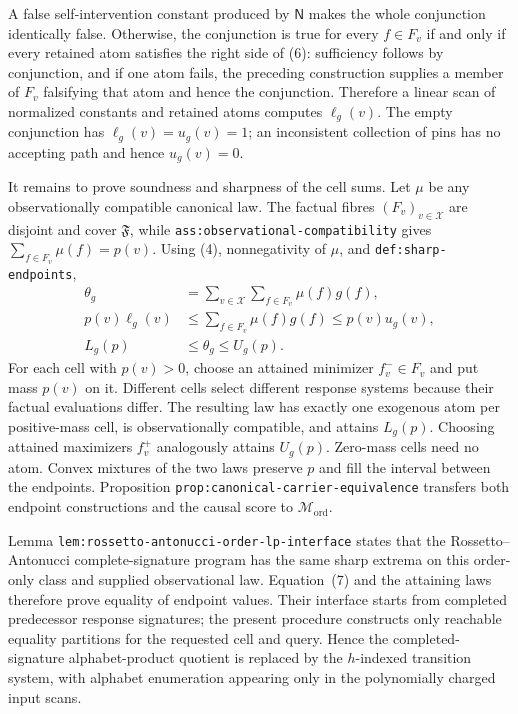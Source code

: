 A false self-intervention constant produced by \(\mathsf N\) makes the whole conjunction identically false.  Otherwise, the conjunction is true for every \(f\in F_v\) if and only if every retained atom satisfies the right side of (6): sufficiency follows by conjunction, and if one atom fails, the preceding construction supplies a member of \(F_v\) falsifying that atom and hence the conjunction.  Therefore a linear scan of normalized constants and retained atoms computes \(\ell_g(v)\).  The empty conjunction has \(\ell_g(v)=u_g(v)=1\); an inconsistent collection of pins has no accepting path and hence \(u_g(v)=0\).

It remains to prove soundness and sharpness of the cell sums.  Let \(\mu\) be any observationally compatible canonical law.  The factual fibres \((F_v)_{v\in\mathcal X}\) are disjoint and cover \(\mathfrak F\), while \texttt{ass:observational-compatibility} gives \(\sum_{f\in F_v}\mu(f)=p(v)\).  Using (4), nonnegativity of \(\mu\), and \texttt{def:sharp-endpoints},
\[
 \begin{aligned}
 \theta_g
 &=\sum_{v\in\mathcal X}\sum_{f\in F_v}\mu(f)g(f),\\
 p(v)\ell_g(v)
 &\leq\sum_{f\in F_v}\mu(f)g(f)
 \leq p(v)u_g(v),\\
 L_g(p)&\leq\theta_g\leq U_g(p).
 \end{aligned}
\tag{7}
\]
For each cell with \(p(v)>0\), choose an attained minimizer \(f_v^-\in F_v\) and put mass \(p(v)\) on it.  Different cells select different response systems because their factual evaluations differ.  The resulting law has exactly one exogenous atom per positive-mass cell, is observationally compatible, and attains \(L_g(p)\).  Choosing attained maximizers \(f_v^+\) analogously attains \(U_g(p)\).  Zero-mass cells need no atom.  Convex mixtures of the two laws preserve \(p\) and fill the interval between the endpoints.  Proposition \texttt{prop:canonical-carrier-equivalence} transfers both endpoint constructions and the causal score to \(\mathcal M_{\mathrm{ord}}\).

Lemma \texttt{lem:rossetto-antonucci-order-lp-interface} states that the Rossetto--Antonucci complete-signature program has the same sharp extrema on this order-only class and supplied observational law.  Equation~(7) and the attaining laws therefore prove equality of endpoint values.  Their interface starts from completed predecessor response signatures; the present procedure constructs only reachable equality partitions for the requested cell and query.  Hence the completed-signature alphabet-product quotient is replaced by the \(h\)-indexed transition system, with alphabet enumeration appearing only in the polynomially charged input scans.

